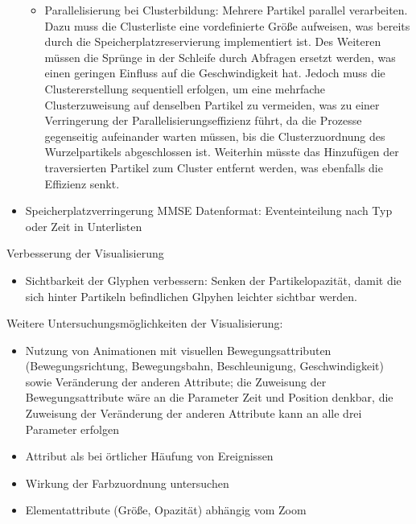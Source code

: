 \begin{itemize}
\begin{itemize}
		\item Parallelisierung bei Clusterbildung: Mehrere Partikel parallel verarbeiten. Dazu muss die Clusterliste eine vordefinierte Größe aufweisen, was bereits durch die Speicherplatzreservierung implementiert ist. Des Weiteren müssen die Sprünge in der Schleife durch Abfragen ersetzt werden, was einen geringen Einfluss auf die Geschwindigkeit hat. Jedoch muss die Clustererstellung sequentiell erfolgen, um eine mehrfache Clusterzuweisung auf denselben Partikel zu vermeiden, was zu einer Verringerung der Parallelisierungseffizienz führt, da die Prozesse gegenseitig aufeinander warten müssen, bis die Clusterzuordnung des Wurzelpartikels abgeschlossen ist. Weiterhin müsste das Hinzufügen der traversierten Partikel zum Cluster entfernt werden, was ebenfalls die Effizienz senkt.
	\end{itemize}
	\item Speicherplatzverringerung MMSE Datenformat: Eventeinteilung nach Typ oder Zeit in Unterlisten
\end{itemize}

Verbesserung der Visualisierung
\begin{itemize}
	\item Sichtbarkeit der Glyphen verbessern: Senken der Partikelopazität, damit die sich hinter Partikeln befindlichen Glpyhen leichter sichtbar werden.
\end{itemize}

Weitere Untersuchungsmöglichkeiten der Visualisierung:
\begin{itemize}
	\item Nutzung von Animationen mit visuellen Bewegungsattributen (Bewegungsrichtung, Bewegungsbahn, Beschleunigung, Geschwindigkeit) sowie Veränderung der anderen Attribute; die Zuweisung der Bewegungsattribute wäre an die Parameter Zeit und Position denkbar, die Zuweisung der Veränderung der anderen Attribute kann an alle drei Parameter erfolgen
	\item Attribut  als  bei örtlicher Häufung von Ereignissen
	\item Wirkung der Farbzuordnung untersuchen
	\item Elementattribute (Größe, Opazität) abhängig vom Zoom
\end{itemize}

